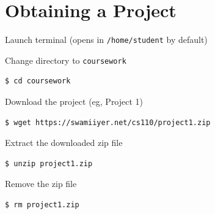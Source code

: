 \documentclass[8pt,a4paper,compress]{beamer}
\begin{document}
\section{Obtaining a Project}
\begin{frame}[fragile]
\pause\transdissolve

Launch terminal (opens in \lstinline{/home/student} by default)

\pause\transdissolve\bigskip

Change directory to \lstinline{coursework}

\begin{tcolorbox}[enhanced,drop shadow southwest,sharp corners,size=fbox,colback=black]
\begin{lstlisting}[style=terminal]
$ cd coursework
\end{lstlisting}
\end{tcolorbox}

\pause\transdissolve\bigskip

Download the project (eg, Project 1)

\begin{tcolorbox}[enhanced,drop shadow southwest,sharp corners,size=fbox,colback=black]
\begin{lstlisting}[style=terminal]
$ wget https://swamiiyer.net/cs110/project1.zip
\end{lstlisting}
\end{tcolorbox}

\pause\transdissolve\bigskip

Extract the downloaded zip file

\begin{tcolorbox}[enhanced,drop shadow southwest,sharp corners,size=fbox,colback=black]
\begin{lstlisting}[style=terminal]
$ unzip project1.zip
\end{lstlisting}
\end{tcolorbox}

\pause\transdissolve\bigskip

Remove the zip file

\begin{tcolorbox}[enhanced,drop shadow southwest,sharp corners,size=fbox,colback=black]
\begin{lstlisting}[style=terminal]
$ rm project1.zip
\end{lstlisting}
\end{tcolorbox}
\end{frame}
\end{document}

